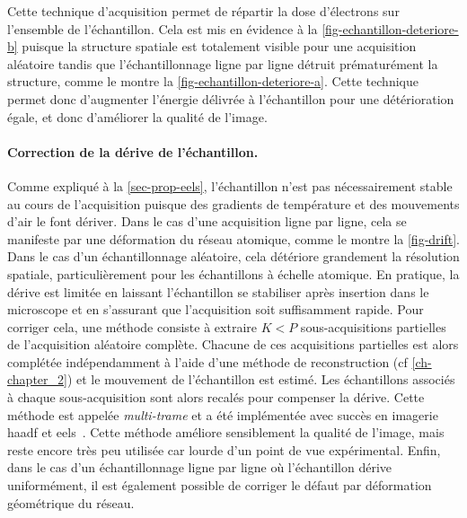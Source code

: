     Cette technique d'acquisition permet de répartir la dose d'électrons sur l'ensemble de l'échantillon. Cela est mis en évidence à la \cref{fig-echantillon-deteriore-b} puisque la structure spatiale est totalement visible pour une acquisition aléatoire tandis que l'échantillonnage ligne par ligne  détruit prématurément la structure, comme le montre la \cref{fig-echantillon-deteriore-a}. Cette technique permet donc d'augmenter l'énergie délivrée à l'échantillon pour une détérioration égale, et donc d'améliorer la qualité de l'image.
    
    
    \paragraph{Correction de la dérive de l'échantillon.} Comme expliqué à la \cref{sec-prop-eels}, l'échantillon n'est pas nécessairement stable au cours de l'acquisition puisque des gradients de température et des mouvements d'air le font dériver. Dans le cas d'une acquisition ligne par ligne, cela se manifeste par une déformation du réseau atomique, comme le montre la \cref{fig-drift}. Dans le cas d'un échantillonnage aléatoire, cela détériore grandement la résolution spatiale, particulièrement pour les échantillons à échelle atomique. 
    En pratique, la dérive est limitée en laissant l'échantillon se stabiliser après insertion dans le microscope et en s'assurant que l'acquisition soit suffisamment rapide.
    Pour corriger cela, une méthode consiste à extraire $K<P$ sous-acquisitions partielles de l'acquisition aléatoire complète. Chacune de ces acquisitions partielles est alors complétée indépendamment à l'aide d'une méthode de reconstruction (cf \cref{ch-chapter_2}) et le mouvement de l'échantillon est estimé. Les échantillons associés à chaque sous-acquisition sont alors recalés pour compenser la dérive. Cette méthode est appelée \emph{multi-trame} et a été implémentée avec succès en imagerie \gls{haadf} et \gls{eels}~\cite{zobelli2019spatial}. Cette méthode améliore sensiblement la qualité de l'image, mais reste encore très peu utilisée car lourde d'un point de vue expérimental. Enfin, dans le cas d'un échantillonnage ligne par ligne où l'échantillon dérive uniformément, il est également possible de corriger le défaut par déformation géométrique du réseau.

